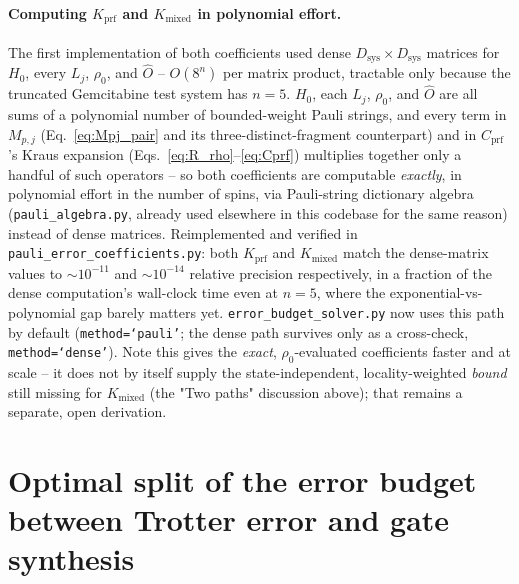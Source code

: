 \documentclass[11pt]{article}
\begin{document}
\paragraph{Computing \texorpdfstring{$K_{\text{prf}}$}{Kprf} and \texorpdfstring{$K_{\text{mixed}}$}{Kmixed} in polynomial effort.} The first implementation of both coefficients used dense $D_{\text{sys}}\times D_{\text{sys}}$ matrices for $H_0$, every $L_j$, $\rho_0$, and $\hat{O}$ -- $O(8^n)$ per matrix product, tractable only because the truncated Gemcitabine test system has $n=5$. $H_0$, each $L_j$, $\rho_0$, and $\hat{O}$ are all sums of a polynomial number of bounded-weight Pauli strings, and every term in $M_{p,j}$ (Eq.~\eqref{eq:Mpj_pair} and its three-distinct-fragment counterpart) and in $C_{\text{prf}}$'s Kraus expansion (Eqs.~\eqref{eq:R_rho}--\eqref{eq:Cprf}) multiplies together only a handful of such operators -- so both coefficients are computable \emph{exactly}, in polynomial effort in the number of spins, via Pauli-string dictionary algebra (\texttt{pauli\_algebra.py}, already used elsewhere in this codebase for the same reason) instead of dense matrices. Reimplemented and verified in \texttt{pauli\_error\_coefficients.py}: both $K_{\text{prf}}$ and $K_{\text{mixed}}$ match the dense-matrix values to $\sim10^{-11}$ and $\sim10^{-14}$ relative precision respectively, in a fraction of the dense computation's wall-clock time even at $n=5$, where the exponential-vs-polynomial gap barely matters yet. \texttt{error\_budget\_solver.py} now uses this path by default (\texttt{method=`pauli'}; the dense path survives only as a cross-check, \texttt{method=`dense'}). Note this gives the \emph{exact}, $\rho_0$-evaluated coefficients faster and at scale -- it does not by itself supply the state-independent, locality-weighted \emph{bound} still missing for $K_{\text{mixed}}$ (the "Two paths" discussion above); that remains a separate, open derivation.

\section{Optimal split of the error budget between Trotter error and gate synthesis}
\label{sec:optimal_split}
\end{document}
